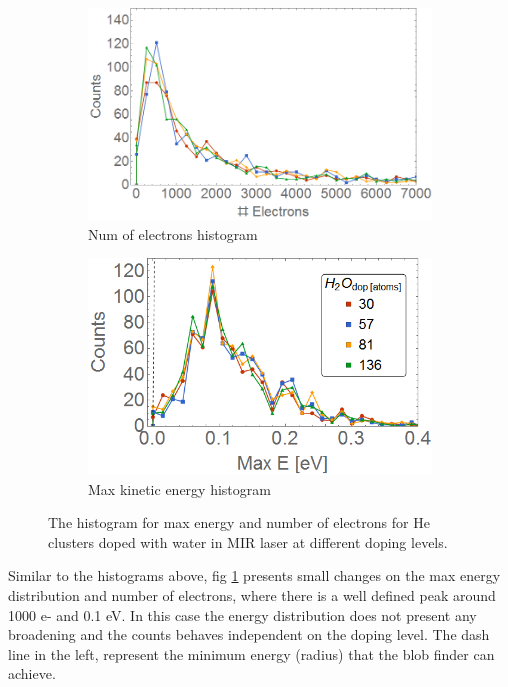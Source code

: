 \begin{figure}[h!]
\centering
\begin{subfigure}[l]{0.49\textwidth}\caption{Num of electrons histogram}
\includegraphics[width=1\textwidth]{../Images/results/MIR_He_waterDop/Helec.png} 
\end{subfigure}
\begin{subfigure}[l]{0.49\textwidth}\caption{Max kinetic energy histogram}
\includegraphics[width=1\textwidth]{../Images/results/MIR_He_waterDop/Heberg.png}   				\end{subfigure}
\caption[MIR He-Water. Histograms]{The histogram for max energy and number of electrons for He clusters doped with water in MIR laser at different doping levels.}
\label{fig:histowaterdop}
\end{figure}

Similar to the histograms above, fig \ref{fig:histowaterdop} presents small changes on the max energy distribution and number of electrons, where there is a well defined peak around 1000 e- and 0.1 eV. In this case the energy distribution does not present any broadening and the counts behaves independent on the doping level. The dash line in the left, represent the minimum energy (radius) that the blob finder can achieve.

